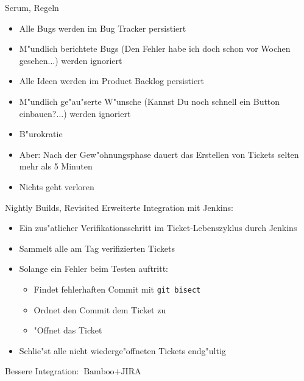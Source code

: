 \documentclass{beamer}
\newcommand{\cmark}{\ding{51}}
\newcommand{\xmark}{\ding{55}}
\begin{document}
\begin{frame}{Scrum, Regeln}
	\begin{itemize}
		\item Alle Bugs werden im Bug Tracker persistiert
		\item M"undlich berichtete Bugs (\glqq{}Den Fehler habe ich doch schon vor Wochen gesehen$\ldots$\grqq) werden ignoriert
		\item Alle Ideen werden im Product Backlog persistiert
		\item M"undlich ge"au"serte W"unsche (\glqq{}Kannst Du noch schnell ein Button einbauen?$\ldots$\grqq) werden ignoriert
		\item B"urokratie \xmark
		\item Aber: Nach der Gew"ohnungsphase dauert das Erstellen von Tickets selten mehr als 5 Minuten
		\item Nichts geht verloren \cmark
	\end{itemize}
\end{frame}

\begin{frame}{Nightly Builds, Revisited}
	Erweiterte Integration mit Jenkins:
	\begin{itemize}
		\item Ein zus"atlicher Verifikationsschritt im Ticket-Lebenszyklus durch Jenkins
		\item Sammelt alle am Tag verifizierten Tickets
		\item Solange ein Fehler beim Testen auftritt:
			\begin{itemize}
				\item Findet fehlerhaften Commit mit \texttt{git bisect}
				\item Ordnet den Commit dem Ticket zu
				\item "Offnet das Ticket
			\end{itemize}
		\item Schlie"st alle nicht wiederge"offneten Tickets endg"ultig
	\end{itemize}
	Bessere Integration: $\text{Bamboo} + \text{JIRA}$
\end{frame}
\end{document}
